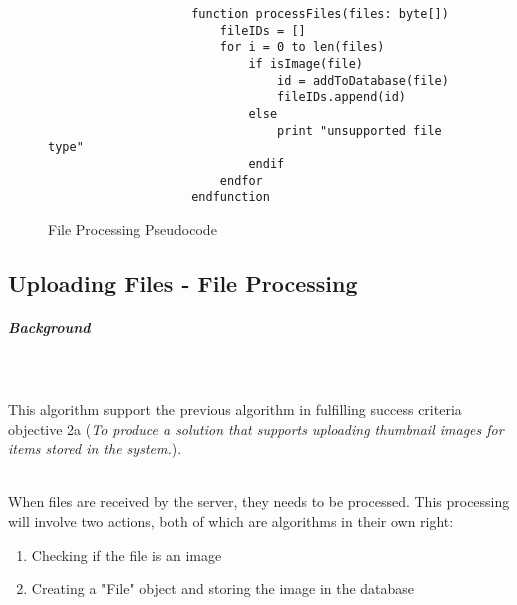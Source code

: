 \documentclass[../../main.tex]{subfiles}
\begin{document}
\begin{dummyenv}
    \begin{wrapfigure}{r}[64pt]{0.5\textwidth}
        \begin{framed}{}
            \begin{lstlisting}
                    function processFiles(files: byte[])
                        fileIDs = []
                        for i = 0 to len(files)
                            if isImage(file)
                                id = addToDatabase(file)
                                fileIDs.append(id)
                            else
                                print "unsupported file type"
                            endif
                        endfor
                    endfunction
            \end{lstlisting}
            \caption{
                \centering
                File Processing Pseudocode
            }
        \end{framed}
        \label{fig:wrapfig}
    \end{wrapfigure}

    \setlength{\parindent}{0mm}
    \begin{minipage}[t]{1\linewidth}
        \paragraph{} %

        \subsection{Uploading Files - File Processing}

        \subparagraph{Background}

        \noindent \\\\ This algorithm support the previous algorithm in fulfilling success criteria objective 2a
        (\textit{To produce a solution that supports uploading thumbnail images for items stored in the system.}).

        \noindent \\ When files are received by the server, they needs to be processed. This processing will involve
        two actions, both of which are algorithms in their own right:\\
    \end{minipage}
\end{dummyenv}


\begin{enumerate}
    \item Checking if the file is an image
    \item Creating a "File" object and storing the image in the database
\end{enumerate}
\end{document}
